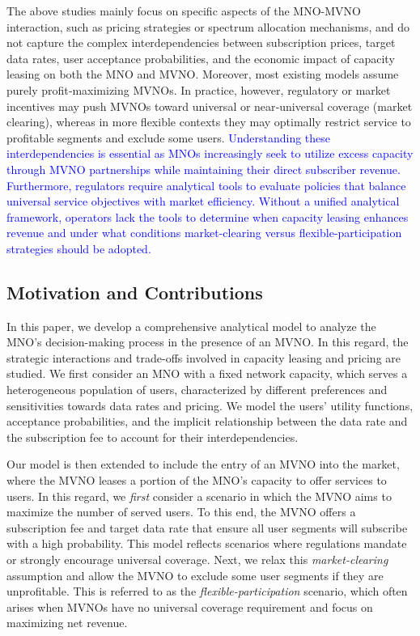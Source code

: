 \documentclass[12pt, draftclsnofoot, onecolumn]{IEEEtran}
\begin{document}
	The above studies mainly focus on specific aspects of the MNO-MVNO interaction, such as pricing strategies or spectrum allocation mechanisms, and do not capture the complex interdependencies between subscription prices, target data rates, user acceptance probabilities, and the economic impact of capacity leasing on both the MNO and MVNO. Moreover, most existing models assume purely profit‑maximizing MVNOs. In practice, however, regulatory or market incentives may push MVNOs toward universal or near‑universal coverage (market clearing), whereas in more flexible contexts they may optimally restrict service to profitable segments and exclude some users. \textcolor{blue}{Understanding these interdependencies is essential as MNOs increasingly seek to utilize excess capacity through MVNO partnerships while maintaining their direct subscriber revenue. Furthermore, regulators require analytical tools to evaluate policies that balance universal service objectives with market efficiency. Without a unified analytical framework, operators lack the tools to determine when capacity leasing enhances revenue and under what conditions market-clearing versus flexible-participation strategies should be adopted.}

	
	
	
	\subsection{Motivation and Contributions}
	In this paper, we develop a comprehensive analytical model to analyze the MNO's decision-making process in the presence of an MVNO. In this regard, the strategic interactions and trade-offs involved in capacity leasing and pricing are studied. We first consider an MNO with a fixed network capacity, which serves a heterogeneous population of users, characterized by different preferences and sensitivities towards data rates and pricing. We model the users' utility functions, acceptance probabilities, and the implicit relationship between the data rate and the subscription fee to account for their interdependencies.
	
	Our model is then extended to include the entry of an MVNO into the market, where the MVNO leases a portion of the MNO's capacity to offer services to users. In this regard, we \emph{first} consider a scenario in which the MVNO aims to maximize the number of served users. To this end, the MVNO offers a subscription fee and target data rate that ensure all user segments will subscribe with a high probability. This model reflects scenarios where regulations mandate or strongly encourage universal coverage. Next, we relax this \textit{market-clearing} assumption and allow the MVNO to exclude some user segments if they are unprofitable. This is referred to as the \emph{flexible-participation} scenario, which often arises when MVNOs have no universal coverage requirement and focus on maximizing net revenue.
	
\end{document}
